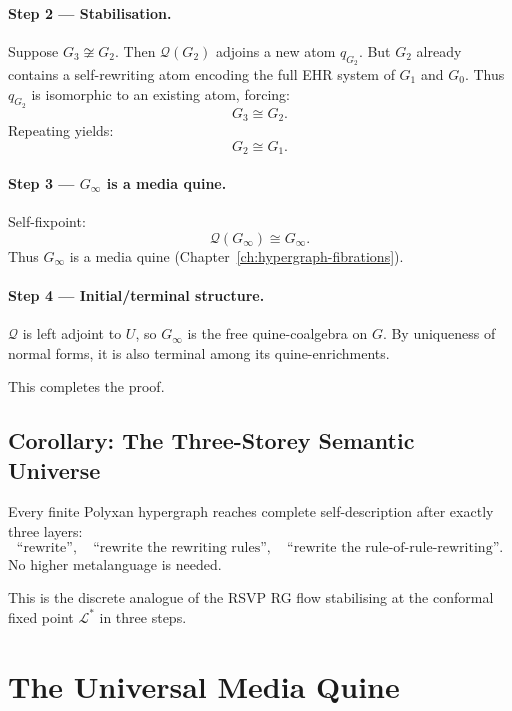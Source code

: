\paragraph{Step 2 — Stabilisation.}
Suppose $G_3\not\cong G_2$.  
Then $\mathcal{Q}(G_2)$ adjoins a new atom $q_{G_2}$.  
But $G_2$ already contains a self-rewriting atom encoding the full EHR system of
$G_1$ and $G_0$.  
Thus $q_{G_2}$ is isomorphic to an existing atom, forcing:
\[
G_3 \cong G_2.
\]
Repeating yields:
\[
G_2 \cong G_1.
\]

\paragraph{Step 3 — $G_\infty$ is a media quine.}
Self-fixpoint:
\[
\mathcal{Q}(G_\infty) \cong G_\infty.
\]
Thus $G_\infty$ is a media quine (Chapter~\ref{ch:hypergraph-fibrations}).

\paragraph{Step 4 — Initial/terminal structure.}
$\mathcal{Q}$ is left adjoint to $U$, so $G_\infty$ is the free quine-coalgebra on
$G$.  
By uniqueness of normal forms, it is also terminal among its quine-enrichments.

This completes the proof.

\subsection{Corollary: The Three-Storey Semantic Universe}

\begin{corollary}
Every finite Polyxan hypergraph reaches complete self-description after 
exactly three layers:
\[
\text{``rewrite''},\quad
\text{``rewrite the rewriting rules''},\quad
\text{``rewrite the rule-of-rule-rewriting''}.
\]
No higher metalanguage is needed.
\end{corollary}

This is the discrete analogue of the RSVP RG flow stabilising at the conformal
fixed point $\mathcal{L}^\ast$ in three steps.

\section{The Universal Media Quine}

